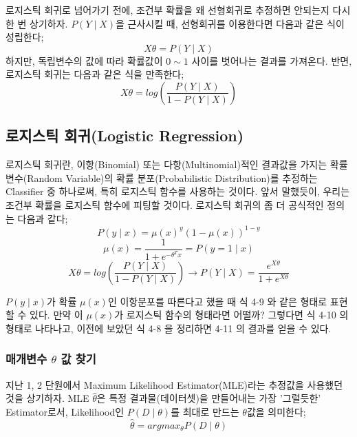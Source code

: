 \documentclass[a4paper]{oblivoir}
\begin{document}
\indent 로지스틱 회귀로 넘어가기 전에, 조건부 확률을 왜 선형회귀로 추정하면 안되는지 다시 한 번 상기하자. $P(Y\mid X)$을 근사시킬 때, 선형회귀를 이용한다면 다음과 같은 식이 성립한다; \begin{equation*}X\theta = P(Y\mid X) \tag{4-7}\end{equation*} 하지만, 독립변수의 값에 따라 확률값이 $0 \sim 1$ 사이를 벗어나는 결과를 가져온다. 반면, 로지스틱 회귀는 다음과 같은 식을 만족한다; \begin{equation*}X\theta = log \left( \frac{P(Y\mid X)}{1-P(Y\mid X)} \right) \tag{4-8}\end{equation*}

\subsection{로지스틱 회귀(Logistic Regression)}
로지스틱 회귀란, 이항(Binomial) 또는 다항(Multinomial)적인 결과값을 가지는 확률 변수(Random Variable)의 확률 분포(Probabilistic Distribution)를 추정하는 Classifier 중 하나로써, 특히 로지스틱 함수를 사용하는 것이다. 앞서 말했듯이, 우리는 조건부 확률을 로지스틱 함수에 피팅할 것이다. 로지스틱 회귀의 좀 더 공식적인 정의는 다음과 같다;
\begin{equation*}
P(y \mid x) = \mu(x)^{y}(1-\mu(x))^{1-y}				\tag{4-9}
\end{equation*}
\begin{equation*}
\mu(x) = \frac{1}{1+e^{-\theta^{T}x}} = P(y=1 \mid x)	\tag{4-10}
\end{equation*}
\begin{equation*}
X\theta = log\left(\frac{P(Y \mid X)}{1- P(Y \mid X)}\right) \to P(Y \mid X) = \frac{e^{X\theta}}{1+e^{X\theta}} \tag{4-11}
\end{equation*}

\indent $P(y \mid x)$가 확률 $\mu (x)$인 이항분포를 따른다고 했을 때 식 4-9 와 같은 형태로 표현할 수 있다. 만약 이 $\mu (x)$가 로지스틱 함수의 형태라면 어떨까? 그렇다면 식 4-10 의 형태로 나타나고, 이전에 보았던 식 4-8 을 정리하면 4-11 의 결과를 얻을 수 있다.

\subsubsection{매개변수 \texorpdfstring{$\theta$}{Lg} 값 찾기}
지난 1, 2 단원에서 Maximum Likelihood Estimator(MLE)라는 추정값을 사용했던 것을 상기하자. MLE $\hat{\theta}$은 특정 결과물(데이터셋)을 만들어내는 가장 '그럴듯한' Estimator로서, Likelihood인 $P(D \mid \theta)$를 최대로 만드는 $\theta$값을 의미한다;
\begin{equation*}\hat{\theta} = argmax_{\theta}P(D \mid \theta) \tag{4-12} \end{equation*}
\end{document}
